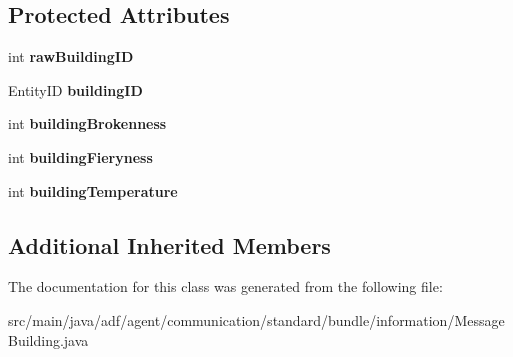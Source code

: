 \subsection*{Protected Attributes}
\begin{DoxyCompactItemize}
\item 
\hypertarget{classadf_1_1agent_1_1communication_1_1standard_1_1bundle_1_1information_1_1MessageBuilding_a5aa4ab2dd6a0fe843ad9f26aed6668b4}{}\label{classadf_1_1agent_1_1communication_1_1standard_1_1bundle_1_1information_1_1MessageBuilding_a5aa4ab2dd6a0fe843ad9f26aed6668b4} 
int {\bfseries raw\+Building\+ID}
\item 
\hypertarget{classadf_1_1agent_1_1communication_1_1standard_1_1bundle_1_1information_1_1MessageBuilding_a67a5f95e085df4050579e0678ed9c300}{}\label{classadf_1_1agent_1_1communication_1_1standard_1_1bundle_1_1information_1_1MessageBuilding_a67a5f95e085df4050579e0678ed9c300} 
Entity\+ID {\bfseries building\+ID}
\item 
\hypertarget{classadf_1_1agent_1_1communication_1_1standard_1_1bundle_1_1information_1_1MessageBuilding_a32cd23f208bf242d268dd6cafb4eb89e}{}\label{classadf_1_1agent_1_1communication_1_1standard_1_1bundle_1_1information_1_1MessageBuilding_a32cd23f208bf242d268dd6cafb4eb89e} 
int {\bfseries building\+Brokenness}
\item 
\hypertarget{classadf_1_1agent_1_1communication_1_1standard_1_1bundle_1_1information_1_1MessageBuilding_abbbca4d13f428f4b05dd0bed7d5ca200}{}\label{classadf_1_1agent_1_1communication_1_1standard_1_1bundle_1_1information_1_1MessageBuilding_abbbca4d13f428f4b05dd0bed7d5ca200} 
int {\bfseries building\+Fieryness}
\item 
\hypertarget{classadf_1_1agent_1_1communication_1_1standard_1_1bundle_1_1information_1_1MessageBuilding_a602e01919129c2c2ccfeeb9072b7668d}{}\label{classadf_1_1agent_1_1communication_1_1standard_1_1bundle_1_1information_1_1MessageBuilding_a602e01919129c2c2ccfeeb9072b7668d} 
int {\bfseries building\+Temperature}
\end{DoxyCompactItemize}
\subsection*{Additional Inherited Members}


The documentation for this class was generated from the following file\+:\begin{DoxyCompactItemize}
\item 
src/main/java/adf/agent/communication/standard/bundle/information/Message\+Building.\+java\end{DoxyCompactItemize}
